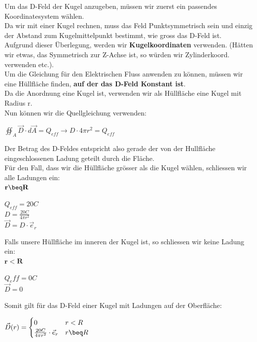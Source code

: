 \beginbsp
Um das D-Feld der Kugel anzugeben, müssen wir zuerst ein passendes Koordinatesystem wählen. \\
Da wir mit einer Kugel rechnen, muss das Feld Punktsymmetrisch sein und einzig der Abstand zum Kugelmittelpunkt bestimmt, wie gross das D-Feld ist. \\
Aufgrund dieser Überlegung, werden wir \textbf{Kugelkoordinaten} verwenden. (Hätten wir etwas, das Symmetrisch zur Z-Achse ist, so würden wir Zylinderkoord. verwenden etc.). \\
Um die Gleichung für den Elektrischen Fluss anwenden zu können, müssen wir eine Hüllfläche finden,   \textbf{auf der das D-Feld Konstant ist}. \\
Da die Anordnung eine Kugel ist, verwenden wir als Hüllfläche eine Kugel mit Radius r. \\
Nun können wir die Quellgleichung verwenden:
\begin{center}
	$ \oiint_A \vec{D}\cdot d\vec{A} = Q_{eff} \rightarrow D \cdot  4\pi r^2  = Q_{eff} $
\end{center}
Der Betrag des D-Feldes entspricht also gerade der von der Hullfläche eingeschlossenen Ladung geteilt durch die Fläche. \\
Für den Fall, dass wir die Hüllfläche grösser als die Kugel wählen, schliessen wir alle Ladungen ein: \\
$\mathbf{r \beq R}$ \\
\begin{center}
	$Q_{eff} = 20C$ \\
	$D = \frac{20C}{4\pi r^2}$ \\
	$\vec{D} = D \cdot \vec{e}_r$
\end{center}

Falls unsere Hüllfläche im inneren der Kugel ist, so schliessen wir keine Ladung ein: \\
$\mathbf{r < R}$ \\
\begin{center}
	$Q_eff = 0C$ \\
	$\vec{D} = 0$
\end{center}

Somit gilt für das D-Feld einer Kugel mit Ladungen auf der Oberfläche: \\
\begin{center}

	$ \displaystyle
	\vec{D}(r) =
	\begin{cases}
		0                                       & r < R \\
		\frac{20 C}{4 \pi r^2} \cdot  \vec{e}_r & r \beq R \\
	\end{cases}$

\end{center}
\iend



